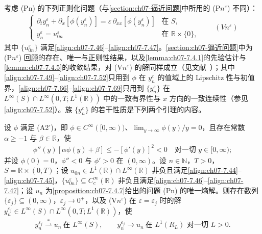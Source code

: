 \documentclass[../../main.tex]{subfiles}%
\begin{document}
考虑 (Pn) 的下列正则化问题（与\cref{section:ch07-逼近问题}中所用的 (P$n^\varepsilon$) 不同）：
\begin{align*}
\begin{cases}
\partial_t y_n^\varepsilon+\partial_x[\phi(y_n^\varepsilon)]=\varepsilon\,\partial_{xx}[\phi(y_n^\varepsilon)] & \text{在 }S,\\
y_n^\varepsilon=u_{0n}^\varepsilon & \text{在 }\mathbb{R}\times\{0\},
\end{cases}
\qquad(Vn^\varepsilon)
\end{align*}
其中 $\{u_{0n}^\varepsilon\}$ 满足\eqref{align:ch07-7.46}--\eqref{align:ch07-7.47}。\cref{section:ch07-逼近问题}中为 (P$n^\varepsilon$) 回顾的存在、唯一与正则性结果，以及\cref{lemma:ch07-7.4.1}的先验估计与\cref{lemma:ch07-7.4.5}的收敛结果，对 (V$n^\varepsilon$) 的解同样成立（见文献~\cite{ref63}）；其中\eqref{align:ch07-7.49}--\eqref{align:ch07-7.52}只用到 $\phi$ 在 $y_n^\varepsilon$ 的值域上的 Lipschitz 性与初值界，\eqref{align:ch07-7.66}--\eqref{align:ch07-7.69}只用到 $\{y_n^\varepsilon\}$ 在 $L^\infty(S)\cap L^\infty(0,T;L^1(\mathbb{R}))$ 中的一致有界性与 $x$ 方向的一致连续性（参见\eqref{align:ch07-7.52}）。族 $\{y_n^\varepsilon\}$ 的若干性质是下列两个引理的内容。

\begin{lemma}\label{lemma:ch07-7.6.1}
设 $\phi$ 满足 (A2')，即 $\phi\in C^\infty([0,\infty))$、$\lim_{y\to\infty}\phi(y)/y=0$，且存在常数 $\alpha\geqslant-1$ 与 $\beta\in\mathbb{R}$，使
\begin{align*}
\phi''(y)[\alpha\phi(y)+\beta]\leqslant-[\phi'(y)]^2<0\quad\text{对一切 }y\in[0,\infty);
\end{align*}
并设 $\phi(0)=0$，$\phi''<0$ 与 $\phi'>0$ 在 $(0,\infty)$。设 $n\in\mathbb{N}$，$T>0$，$S=\mathbb{R}\times(0,T)$；设 $u_{0n}\in L^1(\mathbb{R})\cap L^\infty(\mathbb{R})$ 非负且满足\eqref{align:ch07-7.44}--\eqref{align:ch07-7.45}，$\{u_{0n}^\varepsilon\}\subseteq C_c^\infty(\mathbb{R})$ 非负且满足\eqref{align:ch07-7.46}--\eqref{align:ch07-7.47}；设 $u_n$ 为\cref{proposition:ch07-7.4.7}给出的问题 (Pn) 的唯一熵解。则存在数列 $\{\varepsilon_j\}\subseteq(0,\infty)$，$\varepsilon_j\to0^+$，以及 (V$n^\varepsilon$) 在 $\varepsilon=\varepsilon_j$ 时的解 $y_n^{\varepsilon_j}\in L^\infty(S)\cap L^\infty(0,T;L^1(\mathbb{R}))$，使
\begin{align}
y_n^{\varepsilon_j}\stackrel{*}{\rightharpoonup}u_n\ \text{在 }L^\infty(S),\qquad
y_n^{\varepsilon_j}\to u_n\ \text{在 }L^1(R_L)\text{ 对一切 }L>0. \label{align:ch07-7.165}
\end{align}
\end{lemma}
\end{document}
